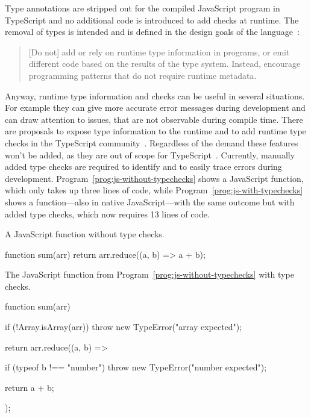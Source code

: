 Type annotations are stripped out for the compiled JavaScript program in TypeScript and no additional code is introduced to add checks at runtime. The removal of types is intended and is defined in the design goals of the language~\cite{TypeScriptWiki:DesignGoals}:
\begin{quote}
  [Do not] add or rely on runtime type information in programs,
  or emit different code based on the results of the type system.
  Instead, encourage programming patterns that do not require runtime metadata.
\end{quote}
Anyway, runtime type information and checks can be useful in several situations. 
For example they can give more accurate error messages during development and can 
draw attention to issues, that are not observable during compile time.
There are proposals to expose type information to the runtime and to add runtime type
checks in the TypeScript community~\cites{TypeScriptIssue:RuntimeTypeChecking, TypeScriptIssue:RuntimeTypeChecks, TypeScriptIssue:EmitTypeArguments}. Regardless of the demand these features won't be added, as they are out of scope
for TypeScript~\cite{TypeScriptIssue:RuntimeTypeChecking:Comment:OutOfScope, TypeScriptIssue:EmitTypeArguments:Comment:OutOfScope}.
Currently, manually added type checks are required to identify and to easily trace errors during development. Program~\ref{prog:js-without-typechecks} shows a JavaScript function, which only takes up three lines of code, while Program~\ref{prog:js-with-typechecks} shows a function---also in native JavaScript---with the same outcome but with added type checks, which now requires 13 lines of code.
\begin{program}
\caption{A JavaScript function without type checks.}
\label{prog:js-without-typechecks}
\begin{JsCode}
function sum(arr) {
  return arr.reduce((a, b) =>  a + b);
}
\end{JsCode}
\end{program}
\begin{program}
\caption{The JavaScript function from Program~\ref{prog:js-without-typechecks} with type checks.}
\label{prog:js-with-typechecks}
\begin{JsCode}
function sum(arr) {
  if (!Array.isArray(arr)) {
    throw new TypeError("array expected");
  }
  
  return arr.reduce((a, b) => {
    if (typeof b !== "number") {
      throw new TypeError("number expected");
    }
    
    return a + b;
  });
}
\end{JsCode}
\end{program}
